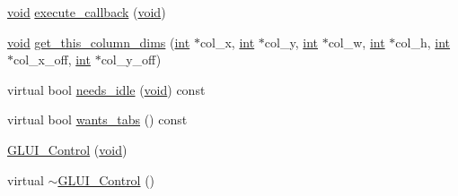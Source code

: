 \begin{DoxyCompactItemize}
\item 
\hyperlink{wglext_8h_a9e6b7f1933461ef318bb000d6bd13b83}{void} \hyperlink{class_g_l_u_i___control_a76fe9cee85c7a296610a73b0ba12aa9c}{execute\+\_\+callback} (\hyperlink{wglext_8h_a9e6b7f1933461ef318bb000d6bd13b83}{void})
\item 
\hyperlink{wglext_8h_a9e6b7f1933461ef318bb000d6bd13b83}{void} \hyperlink{class_g_l_u_i___control_a0cb273fd3dca9fb84809a4d350668c32}{get\+\_\+this\+\_\+column\+\_\+dims} (\hyperlink{wglext_8h_a500a82aecba06f4550f6849b8099ca21}{int} $\ast$col\+\_\+x, \hyperlink{wglext_8h_a500a82aecba06f4550f6849b8099ca21}{int} $\ast$col\+\_\+y, \hyperlink{wglext_8h_a500a82aecba06f4550f6849b8099ca21}{int} $\ast$col\+\_\+w, \hyperlink{wglext_8h_a500a82aecba06f4550f6849b8099ca21}{int} $\ast$col\+\_\+h, \hyperlink{wglext_8h_a500a82aecba06f4550f6849b8099ca21}{int} $\ast$col\+\_\+x\+\_\+off, \hyperlink{wglext_8h_a500a82aecba06f4550f6849b8099ca21}{int} $\ast$col\+\_\+y\+\_\+off)
\item 
virtual bool \hyperlink{class_g_l_u_i___control_a420fb3c5991b6486754ba192f8ab8274}{needs\+\_\+idle} (\hyperlink{wglext_8h_a9e6b7f1933461ef318bb000d6bd13b83}{void}) const 
\item 
virtual bool \hyperlink{class_g_l_u_i___control_a42a65c9dbc0690e270a8c0033fbc1845}{wants\+\_\+tabs} () const 
\item 
\hyperlink{class_g_l_u_i___control_a09c6f812cb8b6ba83e15fd96d0018552}{G\+L\+U\+I\+\_\+\+Control} (\hyperlink{wglext_8h_a9e6b7f1933461ef318bb000d6bd13b83}{void})
\item 
virtual \hyperlink{class_g_l_u_i___control_a8afdc7d81a09fa30a759d5456559e637}{$\sim$\+G\+L\+U\+I\+\_\+\+Control} ()
\end{DoxyCompactItemize}
